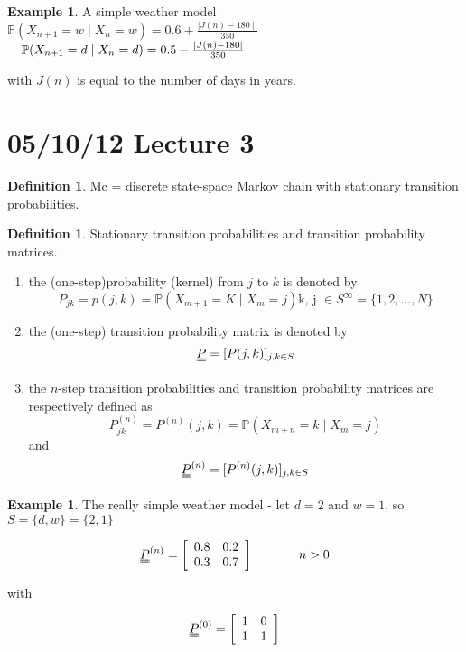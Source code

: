 \documentclass{article}
\theoremstyle{definition}
\newtheorem{defn}[thm]{Definition}
\newtheorem{ex}[thm]{Example}
\begin{document}
\begin{ex} A simple weather model\\

$\mathbb{P} (X_{n+1} = w \mid X_n = w ) = 0.6 + \frac{\mid J(n) - 180 \mid}{350}$ 
$\hspace*{0.15 in} \mathbb{P} (X_{n+1} = d \mid X_n = d ) = 0.5 - \frac{\mid J(n) - 180 \mid}{350}$

with $J(n)$ is equal to the number of days in years. 
\end{ex}

\section{05/10/12 Lecture 3}

\begin{defn} Mc = discrete state-space Markov chain with stationary transition probabilities.
\end{defn}

\begin{defn} Stationary transition probabilities and transition probability matrices.
\end{defn}

\begin{enumerate}
\item
the (one-step)probability (kernel) from $j$ to $k$ is denoted by
\[
P_{jk} = p(j,k) = \mathbb{P}(X_{m+1} = K \mid X_m = j) \mbox{k, j }\in S^{\infty} = \{1,2,\ldots, N\}
\]
\item
the (one-step) transition probability matrix is denoted by
\[
\uuline{P} = [P(j,k)]_{j,k \in S}
\]
\item
the $n$-step transition probabilities and transition probability matrices are respectively defined as
\[
P_{jk}^{(n)} = P^{(n)} (j, k) = \mathbb{P}(X_{m+n} = k \mid X_m = j) 
\]
and
\[
\uuline{P}^{(n)} = [P^{(n)} (j,k) ]_{j,k \in S}
\]
\end{enumerate}

\begin{ex}
The really simple weather model - let $d=2$ and $w = 1$, so $S = \{d,w\} = \{2,1\}$

\[
\uuline{P}^{(n)} = \left [ \begin{array}{cc} 0.8 & 0.2 \\ 0.3 & 0.7 \end{array} \right ] \hspace*{0.5 in} n > 0
\]

with

\[
\uuline{P}^{(0)} = \left [ \begin{array}{cc} 1 & 0 \\ 1 & 1 \end{array} \right ]
\]
\end{ex}
\end{document}
